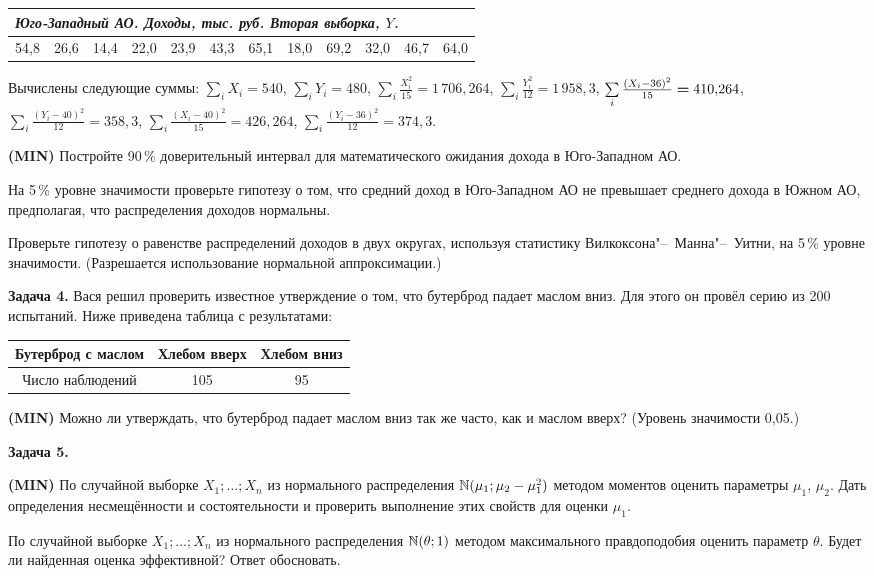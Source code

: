 \documentclass[pdftex,12pt,a4paper]{article}
\newenvironment{enumerate*}{
\begin{enumerate}
  \setlength{\itemsep}{0pt}
  \setlength{\parskip}{0pt}
  \setlength{\parsep}{0pt}
}{\end{enumerate}}
\newcommand{\MIN}{\textbf{(MIN)}{}}
\newenvironment{centered}{%
  \begin{list}{}{%
    \topsep0pt
  }
  \centering
  \item[]
}
{\end{list}}
\begin{document}
\begin{tabular}{|p{6mm}|p{6mm}|p{6mm}|p{6mm}|p{6mm}|p{6mm}|p{6mm}|p{6mm}|p{6mm}|p{6mm}|p{6mm}|p{6mm}|}
\multicolumn{12}{l}{\emph{Юго-Западный АО. Доходы, тыс. руб. Вторая выборка, $Y$.}}\\ \hline
54{,}8 & 26{,}6 & 14{,}4 & 22{,}0 & 23{,}9 & 43{,}3 & 65{,}1 & 18{,}0 & 69{,}2 & 32{,}0 & 46{,}7 & 64{,}0 \\ \hline
\end{tabular}\par\smallskip

Вычислены следующие суммы: $\sum\limits_i X_i=540$, $\sum\limits_i Y_i=480$, $\sum\limits_i \frac{X_i^2}{15}=1\,706{,}264$, $\sum\limits_i \frac{Y_i^2}{12}=1\,958{,}3$, $\sum\limits_i \frac{(X_i-36)^2}{15}\hm=410{,}264$, $\sum\limits_i \frac{(Y_i-40)^2}{12}=358{,}3$, $\sum\limits_i \frac{(X_i-40)^2}{15}=426{,}264$, $\sum\limits_i \frac{(Y_i-36)^2}{12}=374{,}3$.
\begin{enumerate*}
\item \MIN{} Постройте 90\,\% доверительный интервал для математического ожидания дохода в Юго-Западном АО.
\item На 5\,\% уровне значимости проверьте гипотезу о том, что средний доход в Юго-Западном АО не превышает среднего дохода в Южном АО, предполагая, что распределения доходов нормальны.
\item Проверьте гипотезу о равенстве распределений доходов в двух округах, используя статистику Вилкоксона"--~Манна"--~Уитни, на 5\,\% уровне значимости. (Разрешается использование нормальной аппроксимации.)
\end{enumerate*}

\textbf{Задача 4.} Вася решил проверить известное утверждение о том, что бутерброд падает маслом вниз. Для этого он провёл серию из 200 испытаний. Ниже приведена таблица с результатами:

\begin{centered}
\begin{tabular}{|c|c|c|}
\hline
Бутерброд с маслом & Хлебом вверх & Хлебом вниз \\ \hline
Число наблюдений & 105 & 95 \\ \hline
\end{tabular}\end{centered}\par\smallskip
\MIN{} Можно ли утверждать, что бутерброд падает маслом вниз так же часто, как и маслом вверх? (Уровень значимости 0{,}05.)
\par\medskip
\textbf{Задача 5.}
\begin{enumerate*}
\item \MIN{} По случайной выборке $X_1;\ldots;X_n$ из нормального распределения $\mathbb N(\mu_1;\mu_2-\mu_1^2)$ методом моментов оценить параметры $\mu_1$, $\mu_2$. Дать определения несмещённости и состоятельности и проверить выполнение этих свойств для оценки $\mu_1$.
\item По случайной выборке $X_1;\ldots;X_n$ из нормального распределения $\mathbb N(\theta;1)$ методом максимального правдоподобия оценить параметр $\theta$. Будет ли найденная оценка эффективной? Ответ обосновать.
\end{enumerate*}
\end{document}

